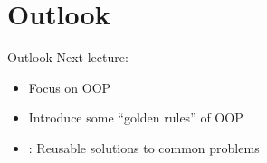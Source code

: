 \section{Outlook}

\begin{frame}{Outlook}
	Next lecture: 
	\begin{itemize}
		\item Focus on OOP
		\item Introduce some \enquote{golden rules} of OOP
		\item {}: Reusable solutions to common problems
	\end{itemize}
\end{frame}